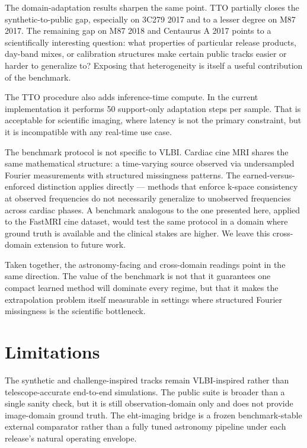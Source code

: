 \documentclass[fleqn,usenatbib]{mnras}
\begin{document}
The domain-adaptation results sharpen the same point. TTO partially closes the synthetic-to-public gap, especially on 3C279 2017 and to a lesser degree on M87 2017. The remaining gap on M87 2018 and Centaurus A 2017 points to a scientifically interesting question: what properties of particular release products, day-band mixes, or calibration structures make certain public tracks easier or harder to generalize to? Exposing that heterogeneity is itself a useful contribution of the benchmark.

The TTO procedure also adds inference-time compute. In the current implementation it performs 50 support-only adaptation steps per sample. That is acceptable for scientific imaging, where latency is not the primary constraint, but it is incompatible with any real-time use case.

The benchmark protocol is not specific to VLBI.
Cardiac cine MRI shares the same mathematical structure:
a time-varying source observed via undersampled Fourier
measurements with structured missingness patterns.
The earned-versus-enforced distinction applies directly ---
methods that enforce k-space consistency at observed
frequencies do not necessarily generalize to unobserved
frequencies across cardiac phases. A benchmark analogous
to the one presented here, applied to the FastMRI cine
dataset, would test the same protocol in a domain where
ground truth is available and the clinical stakes are
higher. We leave this cross-domain extension to future work.

Taken together, the astronomy-facing and cross-domain readings point in the same direction. The value of the benchmark is not that it guarantees one compact learned method will dominate every regime, but that it makes the extrapolation problem itself measurable in settings where structured Fourier missingness is the scientific bottleneck.

\section{Limitations}

The synthetic and challenge-inspired tracks remain VLBI-inspired rather than telescope-accurate end-to-end simulations. The public suite is broader than a single sanity check, but it is still observation-domain only and does not provide image-domain ground truth. The eht-imaging bridge is a frozen benchmark-stable external comparator rather than a fully tuned astronomy pipeline under each release's natural operating envelope.
\end{document}
